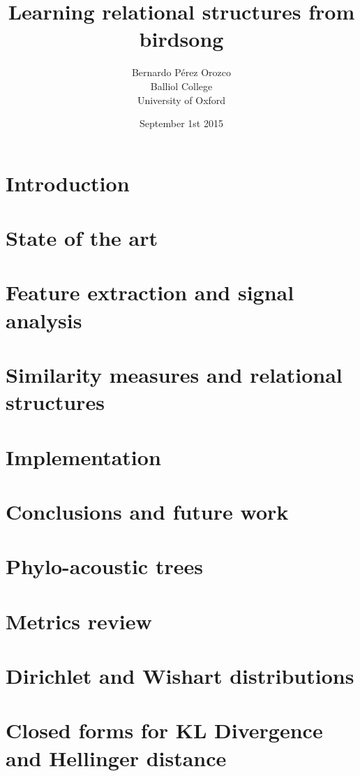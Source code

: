\documentclass[pdftex,12pt,a4paper]{report}
\title{Learning relational structures from birdsong}
\author{Bernardo Pérez Orozco\\Balliol College\\University of Oxford}
\date{ September 1st 2015 }
\theoremstyle{definition}
\theoremstyle{remark}
\begin{document}
 

\tableofcontents
\newpage
\chapter{Introduction}

 
\chapter{State of the art}



\chapter{Feature extraction and signal analysis}
 

 
\chapter{Similarity measures and relational structures}



\chapter{Implementation}



\chapter{Conclusions and future work}







\appendix
\chapter{Phylo-acoustic trees}


\chapter{Metrics review}



\chapter{Dirichlet and Wishart distributions}



\chapter{Closed forms for KL Divergence and Hellinger distance}


\end{document}
